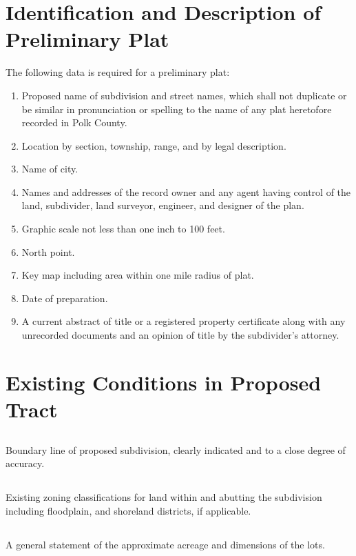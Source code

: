 \section{Identification and Description of Preliminary Plat}
The following data is required for a preliminary plat:
\begin{enumerate}[{\indent}A)]
    \item Proposed name of subdivision and street names, which shall not duplicate or be similar in pronunciation or spelling to the name of any plat heretofore recorded in Polk County.
    \item Location by section, township, range, and by legal description.
    \item Name of city.
    \item Names and addresses of the record owner and any agent having control of the land, subdivider, land surveyor, engineer, and designer of the plan.
    \item Graphic scale not less than one inch to 100 feet.
    \item North point.
    \item Key map including area within one mile radius of plat.
    \item Date of preparation.
    \item A current abstract of title or a registered property certificate along with any unrecorded documents and an opinion of title by the subdivider’s attorney.
\end{enumerate}

\section{Existing Conditions in Proposed Tract}
\subsection{}
Boundary line of proposed subdivision, clearly indicated and to a close degree of accuracy.
\subsection{}
Existing zoning classifications for land within and abutting the subdivision including floodplain, and shoreland districts, if applicable.
\subsection{}
A general statement of the approximate acreage and dimensions of the lots.
